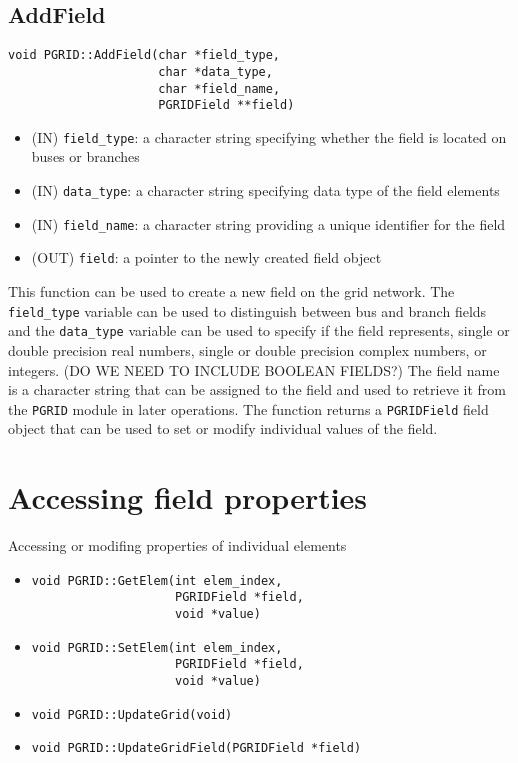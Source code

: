 \documentclass[12pt]{article}
\begin{document}
\subsection{AddField}
\begin{verbatim}
void PGRID::AddField(char *field_type,
                     char *data_type,
                     char *field_name,
                     PGRIDField **field)
\end{verbatim}
\begin{itemize}
\item (IN) \texttt{field\_type}: a character string specifying whether the field
is located on buses or branches
\item (IN) \texttt{data\_type}: a character string specifying data type of the
field elements
\item (IN) \texttt{field\_name}: a character string providing a unique
identifier for the field
\item (OUT) \texttt{field}: a pointer to the newly created field object
\end{itemize}
This function can be used to create a new field on the grid network. The
\texttt{field\_type} variable can be used to distinguish between bus and branch
fields and the \texttt{data\_type} variable can be used to specify if the field
represents, single or double precision real numbers, single or double precision
complex numbers, or integers. (DO WE NEED TO INCLUDE BOOLEAN FIELDS?) The field
name is a character string that can be
assigned to the field and used to retrieve it from the \texttt{PGRID} module in
later operations. The function returns a \texttt{PGRIDField} field object that
can be used to set or modify individual values of the field.

\section{Accessing field properties}
Accessing or modifing properties of individual elements
\begin{itemize}
\item \begin{verbatim}
void PGRID::GetElem(int elem_index,
                    PGRIDField *field,
                    void *value)
\end{verbatim}
\item \begin{verbatim}
void PGRID::SetElem(int elem_index,
                    PGRIDField *field,
                    void *value)
\end{verbatim}
\item \begin{verbatim}
void PGRID::UpdateGrid(void)
\end{verbatim}
\item \begin{verbatim}
void PGRID::UpdateGridField(PGRIDField *field)
\end{verbatim}
\end{itemize}
\end{document}
